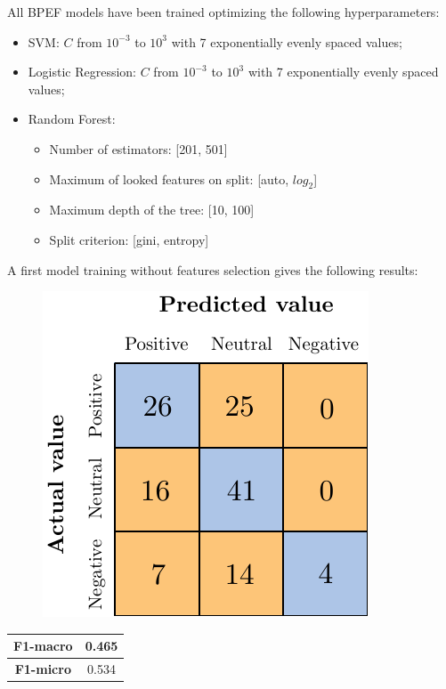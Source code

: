 All BPEF models have been trained optimizing the following hyperparameters:
\begin{itemize}
	\item SVM: $C$ from $10^{-3}$ to $10^3$ with 7 exponentially evenly spaced values;
	\item Logistic Regression: $C$ from $10^{-3}$ to $10^3$ with 7 exponentially evenly spaced values;
	\item Random Forest: 
	\begin{itemize}
		\item Number of estimators: [201, 501]
		\item Maximum of looked features on split: [auto, $log_2$]
		\item Maximum depth of the tree: [10, 100]
		\item Split criterion: [gini, entropy]
	\end{itemize}
\end{itemize}

A first model training without features selection gives the following results:

\begin{figure}[H]
	\centering
	\includegraphics[scale=1]{figures/conf_matrices/ita_snt_bpef/ita_snt_bpef_bfs.pdf}
	\label{fig:ita_snt_bpef_bfs}
\end{figure}

\begin{center}
	\begin{tabular}{ | c | c | } 
		\hline
		\textbf{F1-macro} & 0.465 \\
		\hline
		\textbf{F1-micro} & 0.534 \\ 
		\hline
	\end{tabular}
\end{center}

